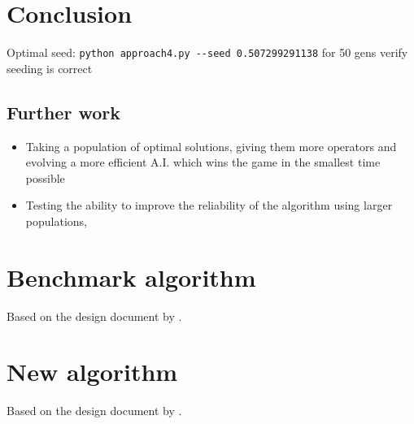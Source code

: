 \documentclass[british,10pt,a4paper]{article}
\begin{document}
\section{Conclusion}
Optimal seed: \lstinline{python approach4.py --seed 0.507299291138} for 50 gens
\TODO verify seeding is correct
\subsection{Further work}
\begin{itemize}
	\item Taking a population of optimal solutions, giving them more operators and evolving a more efficient A.I. which wins the game in the smallest time possible
	\item Testing the ability to improve the reliability of the algorithm using larger populations, 
\end{itemize}

\clearpage



\clearpage
\begin{appendices}

	\section{Benchmark algorithm}\label{app:approach1}
	Based on the design document by \citet{Ehlis2000-sz}. \newline
	
  	\clearpage	

	\section{New algorithm}\label{app:approach4}
	Based on the design document by \citet{Ehlis2000-sz}. \newline
	
  	\clearpage	

\end{appendices}
\clearpage
\end{document}

